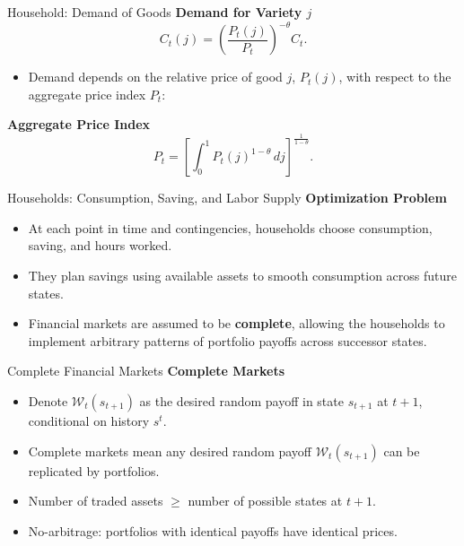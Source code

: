 \documentclass[11pt,aspectratio=169]{beamer}
\begin{document}
\begin{frame}[label=Aggregators]{Household: Demand of Goods}
\small
\textbf{Demand for Variety $j$}
\begin{equation}
C_{t}(j)=\left(\frac{P_{t}(j)}{P_{t}}\right)^{-\theta}C_{t}.
\label{DemandC}
\end{equation}
\vspace{0.45cm}

\begin{itemize} \item Demand depends on the relative price of good $j$, $P_t(j)$, with respect to the aggregate price index $P_t$:
\end{itemize}
\vspace{0.4cm}
\textbf{Aggregate Price Index}
\begin{equation}
P_{t}=\left[\int_{0}^{1} P_{t}(j)^{1-\theta}\,dj\right]^{\!\frac{1}{1-\theta}}.
\label{Pindex}
\end{equation}

\vspace{0.4cm}
\begin{center}
\hyperlink{Appendix D}{}
\end{center}
\end{frame}

\begin{frame}{Households: Consumption, Saving, and Labor Supply}
\small
\textbf{Optimization Problem}
\begin{itemize}
\item At each point in time and contingencies, households choose consumption, saving, and hours worked.

\item They plan savings using available assets to smooth consumption across future states.

\item Financial markets are assumed to be \textbf{complete}, allowing the households to implement arbitrary patterns of portfolio payoffs across successor states.
\end{itemize}
\end{frame}

\begin{frame}{Complete Financial Markets}
\small
\textbf{Complete Markets}
\begin{itemize}
\item Denote $\mathcal{W}_t(s_{t+1})$ as the desired random payoff in state $s_{t+1}$ at $t+1$, conditional on history $s^t$.
\item Complete markets mean any desired random payoff $\mathcal{W}_t(s_{t+1})$ can be replicated by portfolios.
\item Number of traded assets $\geq$ number of possible states at $t+1$.
\item No-arbitrage: portfolios with identical payoffs have identical prices.
\end{itemize}
\end{frame}
\end{document}
